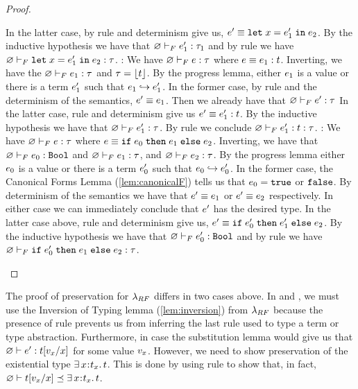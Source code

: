 \begin{proof}
\begin{itemize}
  In the latter case, by rule \eLet and determinism give us, 
  $\sexpr' \equiv \eletin{x}{\sexpr'_1}{\sexpr_2}$.
  By the inductive hypothesis we have that 
  $\hasftype{\varnothing}{\sexpr'_1}{\sftype_1}$ and by rule \fLet 
  we have $\hasftype{\varnothing}{\eletin{x}{\sexpr'_1}{\sexpr_2}}{\sftype}$. 
  \pfcase{\fAnn}: We have 
  $\hasftype{\varnothing}{\sexpr}{\sftype}$ where
  $\sexpr \equiv \tyann{\sexpr_1}{\stype}$. Inverting,
  we have the $\hasftype{\varnothing}{\sexpr_1}{\sftype}$ and
  $\sftype = \forgetreft{\stype}$. 
  By the progress lemma, either $\sexpr_1$ is a value
  or there is a term $\sexpr'_1$ such that $\sexpr_1 \step \sexpr'_1$.
  In the former case, by rule \eAnnV and the determinism of the semantics, 
  $\sexpr' \equiv \sexpr_1$. Then we already have that
  $\hasftype{\varnothing}{\sexpr'}{\sftype}$
  In the latter case, rule \eAnn and determinism give us 
  $\sexpr' \equiv \tyann{\sexpr'_1}{\stype}$. By the inductive hypothesis
  we have that $\hasftype{\varnothing}{\sexpr'_1}{\sftype}$. By rule
  \fAnn we conclude $\hasftype{\varnothing}{\tyann{\sexpr'_1}{\stype}}{\sftype}$.
  \pfcase{\fIf}: We have 
  $\hasftype{\varnothing}{\sexpr}{\sftype}$ where
  $\sexpr \equiv \eif{\sexpr_0}{\sexpr_1}{\sexpr_2}$. Inverting,
  we have that 
  $\hasftype{\varnothing}{\sexpr_0}{\tbool}$
  and
  $\hasftype{\varnothing}{\sexpr_1}{\sftype}$,
  and
  $\hasftype{\varnothing}{\sexpr_2}{\sftype}$.
  By the progress lemma either $\sexpr_0$ is a value
  or there is a term $\sexpr'_0$ such that $\sexpr_0 \step \sexpr'_0$.
  In the former case, the Canonical Forms Lemma (\ref{lem:canonicalF})
  tells us that $\sexpr_0 = \ttrue$ or $\tfalse$.
  By determinism of the semantics we have that 
  $\sexpr' \equiv {\sexpr_1}$
  or $\sexpr' \equiv {\sexpr_2}$ respectively.
  In either case we can immediately conclude that $\sexpr'$
  has the desired type.
  In the latter case above, rule \eIf and determinism give us, 
  $\sexpr' \equiv \eif{\sexpr'_0}{\sexpr'_1}{\sexpr_2}$.
  By the inductive hypothesis we have that 
  $\hasftype{\varnothing}{\sexpr'_0}{\tbool}$ and by rule \fIf 
  we have 
  $\hasftype{\varnothing}{\eif{\sexpr'_0}{\sexpr_1}{\sexpr_2}}{\sftype}$. 
  \end{itemize}
\end{proof}
%
The proof of preservation for $\sysrf$ differs in two cases above. 
In \tApp and \tTApp, we must use the 
Inversion of Typing lemma (\ref{lem:inversion})
from $\sysrf$ because the presence of rule \tSub prevents us from 
inferring the last rule used to type a term or type abstraction.
%
Furthermore, in case \tApp the substitution lemma would give us that 
$\hastype{\varnothing}{\sexpr'}{\subst{\stype}{x}{\sval_x}}$ for 
some value $\sval_x$. However, we need to show preservation of the
existential type $\existype{x}{\stype_x}{\stype}$. This is done by
using rule \sWitn to show that, in fact, 
$\isSubType{\varnothing}{\subst{\stype}{x}{\sval_x}}{\existype{x}{\stype_x}{\stype}}$.


